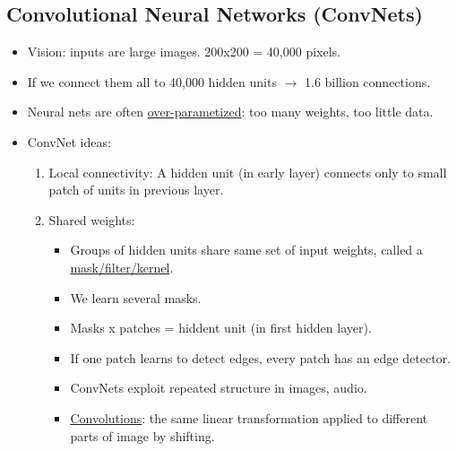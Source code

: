 \documentclass[10pt]{article}
\begin{document}
\subsection*{Convolutional Neural Networks (ConvNets)}
\begin{itemize}
	\item Vision: inputs are large images. 200x200 = 40,000 pixels.
	\item If we connect them all to 40,000 hidden units $\rightarrow$ 1.6 billion connections.
	\item Neural nets are often \underline{over-parametized}: too many weights, too little data.
	\item ConvNet ideas:
		\begin{enumerate}
			\item Local connectivity: A hidden unit (in early layer) connects only to small patch of units in previous layer.
			\item Shared weights:
				\begin{itemize}
					\item Groups of hidden units share same set of input weights, called a \underline{mask/filter/kernel}.
					\item We learn several masks.
					\item Masks x patches = hiddent unit (in first hidden layer).
					\item If one patch learns to detect edges, every patch has an edge detector.
					\item ConvNets exploit repeated structure in images, audio.
					\item \underline{Convolutions}: the same linear transformation applied to different parts of image by shifting.				
				\end{itemize}
		\end{enumerate}
\end{itemize}
\end{document}
